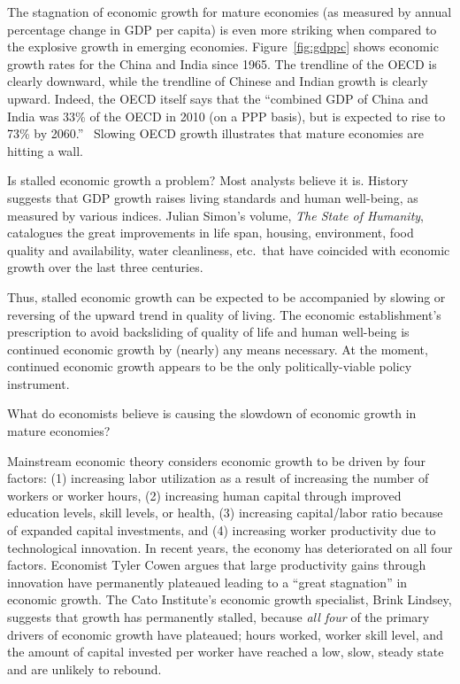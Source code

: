 The stagnation of economic growth for mature economies 
(as measured by annual percentage change in GDP per capita) 
is even more striking 
when compared to the explosive growth in emerging economies. 
Figure~\ref{fig:gdppc} shows 
economic growth rates for the China and India since 1965. 
The trendline of the OECD is clearly downward, 
while the trendline of Chinese and Indian growth is clearly upward.  
Indeed, the OECD itself says that the 
``combined GDP of China and India was 33\% of the OECD in 2010 
(on a PPP basis), 
but is expected to rise to 73\% by 2060.''~\cite[p. 214]{OECD2014} 
Slowing OECD growth illustrates that mature economies are hitting a wall.

Is stalled economic growth a problem? 
Most analysts believe it is. 
History suggests that GDP growth
raises living standards and human well-being,
as measured by various indices. 
Julian Simon's volume, \emph{The State of Humanity}, 
catalogues the great improvements in 
life span, 
housing, 
environment, 
food quality and availability, 
water cleanliness, 
etc.\ 
that have coincided with 
economic growth over the last three centuries.\cite{simon1996} 

Thus, stalled economic growth can be expected 
to be accompanied by slowing or reversing
of the upward trend in quality of living. 
The economic establishment's prescription
to avoid backsliding of quality of life and human well-being
is continued economic growth by (nearly) any means necessary. 
At the moment, continued economic growth appears to be the only 
politically-viable policy instrument.

What do economists believe is causing the slowdown
of economic growth in mature economies? 

Mainstream economic theory considers 
economic growth to be driven by four factors: 
(1) increasing labor utilization as a result of increasing the number of workers or worker hours, 
(2) increasing human capital through improved education levels, skill levels, or health, 
(3) increasing capital/labor ratio because of expanded capital investments, and 
(4) increasing worker productivity due to technological innovation. 
In recent years, the economy has deteriorated on all four factors.
Economist Tyler Cowen argues that large productivity gains 
through innovation have permanently plateaued 
leading to a ``great stagnation'' in economic growth.\cite{Cowen2011}
The Cato Institute's economic growth specialist, Brink Lindsey, 
suggests that growth has permanently stalled, 
because \emph{all four} of the primary drivers of economic growth have plateaued; 
hours worked, 
worker skill level, and
the amount of capital invested per worker 
have reached 
a low, slow, steady state 
and are unlikely to rebound.\cite{lindsey2013} 


